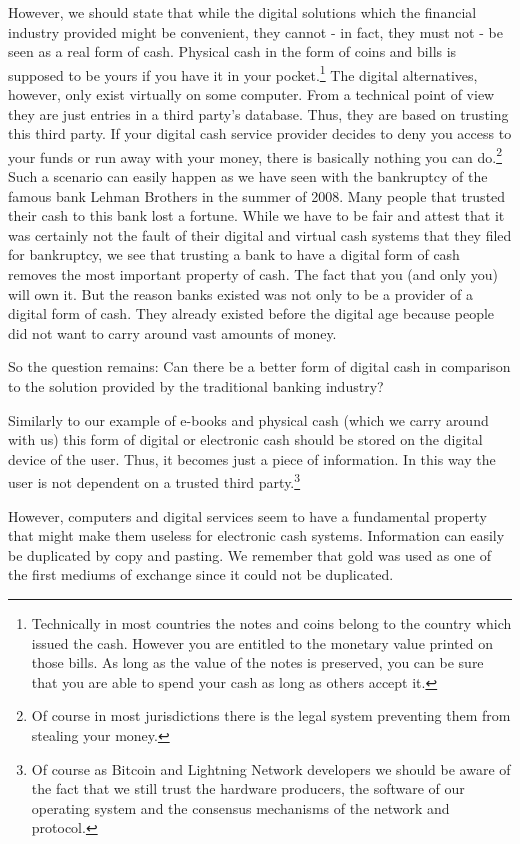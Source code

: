 \documentclass[a4paper,12pt,oneside,openany]{book}
\begin{document}
However, we should state that while the digital solutions which the financial industry provided might be convenient, they cannot - in fact, they must not - be seen as a real form of cash.
Physical cash in the form of coins and bills is supposed to be yours if you have it in your pocket.\footnote{Technically in most countries the notes and coins belong to the country which issued the cash. 
However you are entitled to the monetary value printed on those bills. As long as the value of the notes is preserved, you can be sure that you are able to spend your cash as long as others accept it.}
The digital alternatives, however, only exist virtually on some computer.
From a technical point of view they are just entries in a third party's database.
Thus, they are based on trusting this third party.
If your digital cash service provider decides to deny you access to your funds or run away with your money, there is basically nothing you can do.\footnote{Of course in most jurisdictions there is the legal system preventing them from stealing your money.}
Such a scenario can easily happen as we have seen with the bankruptcy of the famous bank Lehman Brothers in the summer of 2008. Many people that trusted their cash to this bank lost a fortune.
While we have to be fair and attest that it was certainly not the fault of their digital and virtual cash systems that they filed for bankruptcy, we see that trusting a bank to have a digital form of cash removes the most important property of cash.
The fact that you (and only you) will own it.
But the reason banks existed was not only to be a provider of a digital form of cash.
They already existed before the digital age because people did not want to carry around vast amounts of money.

So the question remains: Can there be a better form of digital cash in comparison to the solution provided by the traditional banking industry? 

Similarly to our example of e-books and physical cash (which we carry around with us) this form of digital or electronic cash should be stored on the digital device of the user.
Thus, it becomes just a piece of information.
In this way the user is not dependent on a trusted third party.\footnote{Of course as Bitcoin and Lightning Network developers we should be aware of the fact that we still trust the hardware producers, the software of our operating system and the consensus mechanisms of the network and protocol.}

However, computers and digital services seem to have a fundamental property that might make them useless for electronic cash systems.
Information can easily be duplicated by copy and pasting.
We remember that gold was used as one of the first mediums of exchange since it could not be duplicated.
\end{document}
